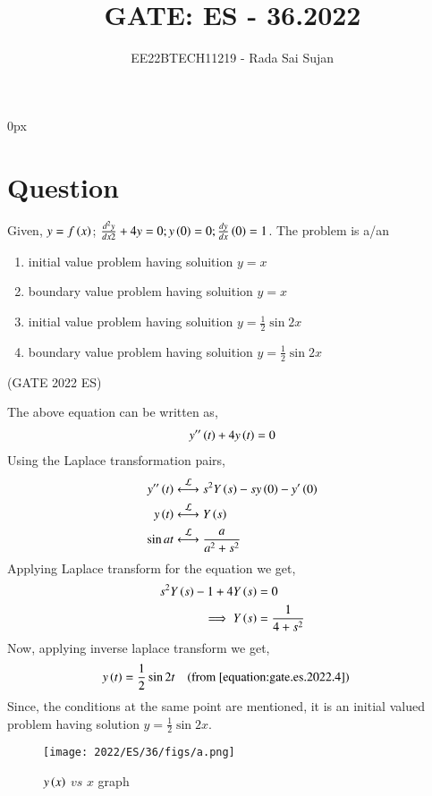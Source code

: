 \documentclass[journal,12pt,twocolumn]{IEEEtran}
\theoremstyle{remark}
\begin{document}
\parindent 0px

\title{GATE: ES - 36.2022}
\author{EE22BTECH11219 - Rada Sai Sujan$^{}$%
}
\maketitle
\newpage
\bigskip
\section*{Question}
Given, $y=f\left(x\right)$; $\frac{d^2y}{dx2}+4y=0; y\left(0\right)=0; \frac{dy}{dx}\left(0\right)=1$. The problem is a/an \\
\begin{enumerate}[label=(\alph*)]
    \item initial value problem having soluition $y=x$
    \item boundary value problem having soluition $y=x$
    \item initial value problem having soluition $y=\frac{1}{2}\sin 2x$
    \item boundary value problem having soluition {$y=\frac{1}{2}\sin 2x$}
\end{enumerate} \hfill(GATE 2022 ES)    \\
\solution
\fi

The above equation can be written as,
\begin{align}
    y^{\prime\prime}\left(t\right)+4y\left(t\right)=0
\end{align}
Using the Laplace transformation pairs,
\begin{align}
    y^{\prime\prime}\left(t\right) &\overset{\mathcal{L}}{ \longleftrightarrow} s^2Y\left(s\right)-sy\left(0\right)-y^{\prime}\left(0\right)    \\
    y\left(t\right) &\overset{\mathcal{L}}{ \longleftrightarrow} Y\left(s\right)    \\
    \sin at &\overset{\mathcal{L}}{ \longleftrightarrow} \frac{a}{a^2+s^2}  \label{equation:gate.es.2022.4}
\end{align}
Applying Laplace transform for the equation we get,
\begin{align}
    s^2Y\left(s\right)-1+4Y\left(s\right) &= 0  \\
    \implies Y\left(s\right) &= \frac{1}{4+s^2}
\end{align}
Now, applying inverse laplace transform we get,
\begin{align}
    y\left(t\right) &= \frac{1}{2}\sin 2t \quad \text{(from \eqref{equation:gate.es.2022.4})}
\end{align}
Since, the conditions at the same point are mentioned, it is an initial valued problem having solution $y=\frac{1}{2}\sin 2x$.
\begin{figure}
    \centering
    \texttt{[image: 2022/ES/36/figs/a.png]}
    \caption{$y\left(x\right)$ $vs$ $x$ graph}
    \label{figure:gate.2022.es.36Q.1}
\end{figure}
\end{document}
